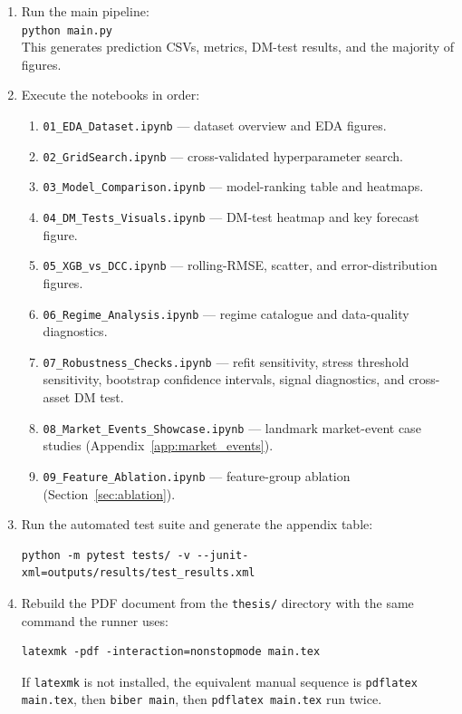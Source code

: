 \begin{enumerate}
    \item Run the main pipeline:\\
          \texttt{python main.py}\\
          This generates prediction CSVs, metrics, DM-test results, and the majority of figures.
    \item Execute the notebooks in order:
    \begin{enumerate}
        \item \texttt{01\_EDA\_Dataset.ipynb} --- dataset overview and EDA figures.
        \item \texttt{02\_GridSearch.ipynb} --- cross-validated hyperparameter search.
        \item \texttt{03\_Model\_Comparison.ipynb} --- model-ranking table and heatmaps.
        \item \texttt{04\_DM\_Tests\_Visuals.ipynb} --- DM-test heatmap and key forecast figure.
        \item \texttt{05\_XGB\_vs\_DCC.ipynb} --- rolling-RMSE, scatter, and error-distribution figures.
        \item \texttt{06\_Regime\_Analysis.ipynb} --- regime catalogue and data-quality diagnostics.
        \item \texttt{07\_Robustness\_Checks.ipynb} --- refit sensitivity, stress threshold sensitivity, bootstrap confidence intervals, signal diagnostics, and cross-asset DM test.
        \item \texttt{08\_Market\_Events\_Showcase.ipynb} --- landmark market-event case studies (Appendix~\ref{app:market_events}).
        \item \texttt{09\_Feature\_Ablation.ipynb} --- feature-group ablation (Section~\ref{sec:ablation}).
    \end{enumerate}
    \item Run the automated test suite and generate the appendix table:
\begin{lstlisting}[language={}]
python -m pytest tests/ -v --junit-xml=outputs/results/test_results.xml
\end{lstlisting}
    \item Rebuild the PDF document from the \texttt{thesis/} directory with the same command the runner uses:
\begin{lstlisting}[language={}]
latexmk -pdf -interaction=nonstopmode main.tex
\end{lstlisting}
    If \texttt{latexmk} is not installed, the equivalent manual sequence is \texttt{pdflatex main.tex}, then \texttt{biber main}, then \texttt{pdflatex main.tex} run twice.
\end{enumerate}

